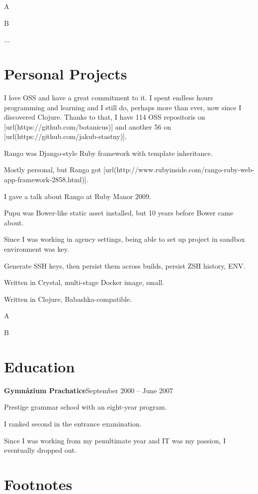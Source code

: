 \startitemize
  \item A
  \item B
  \item ...
\stopitemize

\blank \section{Personal Projects}
I love OSS and have a great commitment to it. I spent endless hours programming and learning and I still do, perhaps more than ever, now since I discovered Clojure. Thanks to that, I have 114 OSS repositoris on [url(https://github.com/botanicus)] and another 56 on [url(https://github.com/jakub-stastny)].

\startitemize
  \item Rango was Django-style Ruby framework with template inheritance.
  \item Mostly personal, but Rango got [url(http://www.rubyinside.com/rango-ruby-web-app-framework-2858.html)].
  \item I gave a talk about Rango at Ruby Manor 2009.
\stopitemize

\startitemize
  \item Pupu was Bower-like static asset installed, but 10 years before Bower came about.
\stopitemize

\startitemize
  \item Since I was working in agency settings, being able to set up project in sandbox environment was key.
  \item Generate SSH keys, then persist them across builds, persist ZSH history, ENV.
  \item Written in Crystal, multi-stage Docker image, small.
\stopitemize

\startitemize
  \item Written in Clojure, Babashka-compatible.
  \item A
  \item B
\stopitemize

\section{Education}
\startitemize
  \item {\bf Gymnázium Prachatice}\hfill{September 2000 -- June 2007}
  \startitemize
    \item Prestige grammar school with an eight-year program.
    \item I ranked second in the entrance examination.
    \item Since I was working from my penultimate year and IT was my passion, I eventually dropped out.
  \stopitemize
\stopitemize

\vfill
\section{Footnotes}
\placenotes[endnote][criterium=all] %
